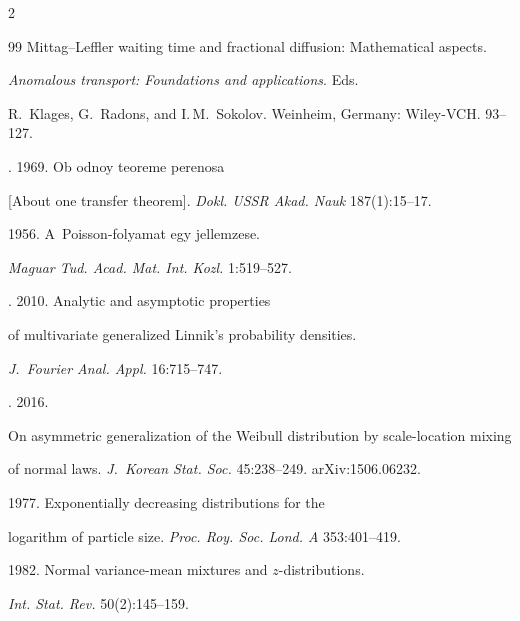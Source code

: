 \begin{multicols}{2}
{{\begin{thebibliography}{99}
Mittag--Leffler waiting time and fractional diffusion: Mathematical aspects. 


\textit{Anomalous transport: Foundations and applications}. Eds.\


R.~Klages, G.~Radons, and I.\,M.~Sokolov. Weinheim, Germany: Wiley-VCH. 93--127. 




. 1969. Ob odnoy teoreme perenosa 


[About one transfer theorem]. \textit{Dokl. USSR Akad. Nauk} 187(1):15--17. 




 1956. A~Poisson-folyamat egy jellemzese. 


\textit{Maguar Tud. Acad. Mat. Int. Kozl.} 1:519--527. 




. 2010. Analytic and asymptotic properties 


of multivariate generalized Linnik's probability densities. 


\textit{J.~Fourier Anal. Appl.} 16:715--747. 




. 2016.


 On asymmetric generalization of the Weibull distribution by scale-location mixing 


 of normal laws. \textit{J.~Korean Stat. Soc.} 45:238--249. arXiv:1506.06232. 




 1977. Exponentially decreasing distributions for the 


logarithm of particle size. \textit{Proc. Roy. Soc. Lond. A} 353:401--419. 









1982. Normal variance-mean mixtures and \mbox{$z$-distributions}. 


\textit{Int. Stat. Rev.} 50(2):145--159. 





\pagebreak






\end{thebibliography}}}
\end{multicols}
